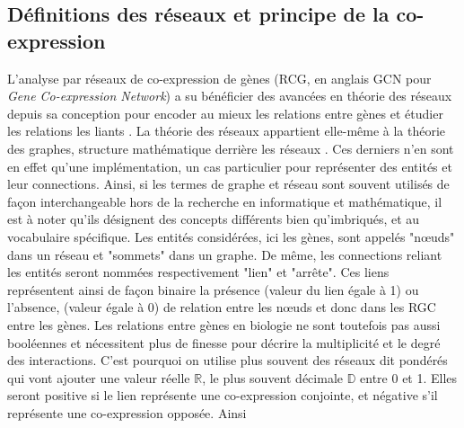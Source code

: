 


\subsection{Définitions des réseaux et principe de la co-expression}

L'analyse par réseaux de co-expression de gènes (RCG, en anglais GCN pour \textit{Gene Co-expression Network}) a su bénéficier des avancées en théorie des réseaux depuis sa conception pour encoder au mieux les relations entre gènes et étudier les relations les liants \cite{Barabasi2011Jan}. La théorie des réseaux appartient elle-même à la théorie des graphes, structure mathématique derrière les réseaux \cite{Barnes1983Jun}. Ces derniers n'en sont en effet qu'une implémentation, un cas particulier pour représenter des entités et leur connections. Ainsi, si les termes de graphe et réseau sont souvent utilisés de façon interchangeable hors de la recherche en informatique et  mathématique, il est à noter qu'ils désignent des concepts différents bien qu'imbriqués, et au vocabulaire spécifique. Les entités considérées, ici les gènes, sont appelés "nœuds" dans un réseau et "sommets" dans un graphe. De même, les connections reliant les entités seront nommées respectivement "lien" et "arrête". 
Ces liens représentent ainsi de façon binaire la présence (valeur du lien égale à 1) ou l'absence, (valeur égale à 0) de relation entre les nœuds et donc dans les RGC entre les gènes. Les relations entre gènes en biologie ne sont toutefois pas aussi booléennes et nécessitent plus de finesse pour décrire la multiplicité et le degré des interactions. C'est pourquoi on utilise plus souvent des réseaux dit pondérés qui vont ajouter une valeur réelle $\mathbb{R}$, le plus souvent décimale $\mathbb{D}$ entre 0 et 1. Elles seront positive si le lien représente une co-expression conjointe, et négative s’il représente une co-expression opposée. Ainsi


